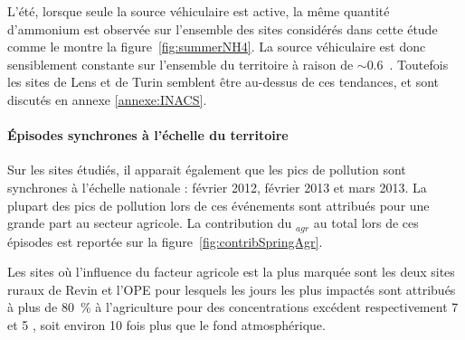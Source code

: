 L'été, lorsque seule la source véhiculaire est active, la même quantité d'ammonium est
observée sur l'ensemble des sites considérés dans cette étude comme le montre la
figure~\ref{fig:summerNH4}.  La source véhiculaire est donc sensiblement constante sur
l'ensemble du territoire à raison de $\sim0.6$~\si{\ugm}.  Toutefois les sites de Lens et
de Turin semblent être au-dessus de ces tendances, et sont discutés en annexe
\ref{annexe:INACS}.

\paragraph{Épisodes synchrones à l'échelle du territoire}

Sur les sites étudiés, il apparait également que les pics de pollution sont synchrones à
l'échelle nationale : février 2012, février 2013 et mars 2013.  La plupart des pics de
pollution lors de ces événements sont attribués pour une grande part au secteur agricole.
La contribution du \NHq$_{agr}$ au \NHq{} total lors de ces épisodes est reportée sur la
figure~\ref{fig:contribSpringAgr}.

Les sites où l'influence du facteur agricole est la plus marquée sont les deux sites
ruraux de Revin et l'OPE pour lesquels les jours les plus impactés sont attribués à plus
de \SI{80}{\percent} à l'agriculture pour des concentrations excédent respectivement 7 et 5
\si{\ugm}, soit environ 10 fois plus que le fond atmosphérique.

